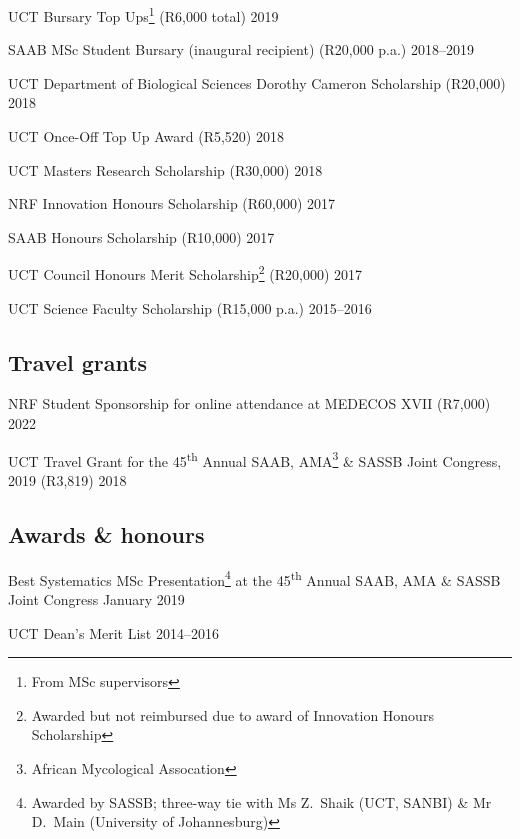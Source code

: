 \documentclass[10pt]{article}
\begin{document}
UCT Bursary Top Ups\footnote{From MSc supervisors} (R6,000 total)    \hfill 2019

SAAB MSc Student Bursary (inaugural recipient) (R20,000 p.a.)  \hfill 2018--2019

UCT Department of Biological Sciences Dorothy Cameron Scholarship
  (R20,000)                                                          \hfill 2018

UCT Once-Off Top Up Award (R5,520)                                   \hfill 2018

UCT Masters Research Scholarship (R30,000)                           \hfill 2018

NRF Innovation Honours Scholarship (R60,000)                         \hfill 2017

SAAB Honours Scholarship (R10,000)                                   \hfill 2017

UCT Council Honours Merit Scholarship\footnote{Awarded but not
  reimbursed due to award of Innovation Honours Scholarship}
  (R20,000)                                                          \hfill 2017

UCT Science Faculty Scholarship (R15,000 p.a.)                 \hfill 2015--2016

\subsection*{Travel grants}

NRF Student Sponsorship for online attendance at MEDECOS XVII
  (R7,000)                                                           \hfill 2022

UCT Travel Grant for the 45\textsuperscript{th} Annual SAAB,
  AMA\footnote{African Mycological Assocation} \& SASSB Joint
  Congress, 2019 (R3,819)                                            \hfill 2018

\subsection*{Awards \& honours}

Best Systematics MSc Presentation\footnote{Awarded by SASSB;
  three-way tie with Ms Z.~Shaik (UCT, SANBI) \& Mr D.~Main
  (University of Johannesburg)} at the 45\textsuperscript{th}
  Annual SAAB, AMA \& SASSB Joint Congress                   \hfill January 2019

UCT Dean's Merit List                                          \hfill 2014--2016
\end{document}
